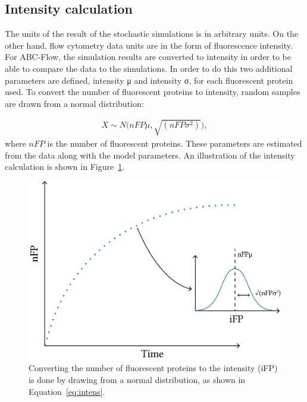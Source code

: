 \subsection{Intensity calculation}

The units of the result of the stochastic simulations is in arbitrary units. On the other hand, flow cytometry data units are in the form of fluorescence intensity. For ABC-Flow, the simulation results are converted to intensity in order to be able to compare the data to the simulations. In order to do this two additional parameters are defined, intensity μ and intensity σ, for each fluorescent protein used. To convert the number of fluorescent proteins to intensity, random samples are drawn from a normal distribution:

\begin{align}
	X\sim N\Big(nFP\mu, \sqrt{(nFP\sigma^2)}\Big), \label{eq:intens}
\end{align}
where $nFP$ is the number of fluorescent proteins. These parameters are estimated from the data along with the model parameters. An illustration of the intensity calculation is shown in Figure~\ref{fig:intensity_calc}. 

\begin{figure}[tb]
	\begin{center}
		\includegraphics[scale=0.5]{../../chapters/chapterABCFlow/images/intensity_calc.png}
		\caption[Converting the number of fluorescent proteins to intensity]{\label{fig:intensity_calc}Converting the number of fluorescent proteins to the intensity (iFP) is done by drawing from a normal distribution, as shown in Equation~\ref{eq:intens}.}
	\end{center}
\end{figure}
\clearpage
